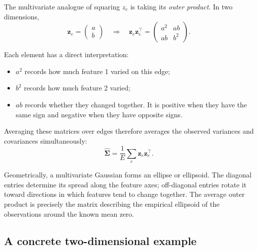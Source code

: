 \documentclass[10pt]{article}
\begin{document}
The multivariate analogue of squaring $z_e$ is taking its \emph{outer
product}.  In two dimensions,
\[
  \mathbf z_e=\begin{pmatrix}a\\b\end{pmatrix}
  \quad\Longrightarrow\quad
  \mathbf z_e\mathbf z_e^\top
  =\begin{pmatrix}a^2&ab\\ab&b^2\end{pmatrix}.
\]

Each element has a direct interpretation:

\begin{itemize}
  \item $a^2$ records how much feature 1 varied on this edge;
  \item $b^2$ records how much feature 2 varied;
  \item $ab$ records whether they changed together.  It is positive when they
        have the same sign and negative when they have opposite signs.
\end{itemize}

Averaging these matrices over edges therefore averages the observed variances
and covariances simultaneously:
\[
  \widehat{\boldsymbol\Sigma}
  =\frac{1}{E}\sum_e\mathbf z_e\mathbf z_e^\top.
\]

Geometrically, a multivariate Gaussian forms an ellipse or ellipsoid.  The
diagonal entries determine its spread along the feature axes; off-diagonal
entries rotate it toward directions in which features tend to change together.
The average outer product is precisely the matrix describing the empirical
ellipsoid of the observations around the known mean zero.

\subsection{A concrete two-dimensional example}
\end{document}
